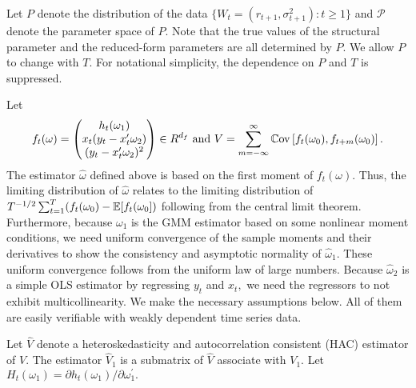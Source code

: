 \documentclass[11pt, letterpaper, twoside]{article}
\begin{document}
Let $P$ denote the distribution of the data $\{W_{t}=(r_{t+1}, \sigma _{t+1}^{2}):t\geq 1\}$ and $\mathcal{P}$ denote the parameter space of $P$. Note that the true values of the structural parameter and the reduced-form parameters are all determined by $P.$ We allow $P$ to change with $T.$ For notational simplicity, the dependence on $P$ and $T$ is suppressed.

Let 
%
\begin{equation}
    f_{t}(\omega) = 
%
    \begin{pmatrix}
        h_{t}(\omega _{1}) \\ 
        x_{t}(y_{t}-x_{t}^{\prime }\omega _{2}) \\ 
        (y_{t}-x_{t}^{\prime }\omega _{2})^{2}%
    \end{pmatrix}
%
     \in R^{d_{f}}\text{ and } 
%
     V =\sum_{m=-\infty }^{\infty }\Cov\left[f_{t}(\omega _{0}),f_{t+m}(\omega _{0})\right].
\end{equation}
%
The estimator $\widehat{\omega }$ defined above is based on the first moment of $f_{t}(\omega ).$ Thus, the limiting distribution of $\widehat{\omega }$ relates to the limiting distribution of $T^{-1/2}\sum_{t=1}^{T}(f_{t}(\omega _{0})-\operatorname{\mathbb{E}}[f_{t}(\omega _{0}])$ following from the central limit theorem. Furthermore, because $\omega _{1}$ is the GMM estimator based on some nonlinear moment conditions, we need uniform convergence of the sample moments and their derivatives to show the consistency and asymptotic normality of $\widehat{\omega }_{1}.$ These uniform convergence follows from the uniform law of large numbers. Because $\widehat{\omega }_{2}$ is a simple OLS estimator by regressing $y_{t}$ and $x_{t},$ we need the regressors to not exhibit multicollinearity. We make the necessary assumptions below. All of them are easily verifiable with weakly dependent time series data.

Let $\widehat{V}$ denote a heteroskedasticity and autocorrelation consistent (HAC) estimator of $V$. The estimator $\widehat{V}_{1}$ is a submatrix of $\widehat{V}$ associate with $V_{1}.$ Let $H_{t}(\omega _{1})=\partial h_{t}(\omega _{1})/\partial \omega _{1}^{\prime }.$
\end{document}
